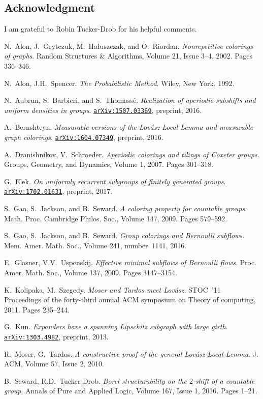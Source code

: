 \documentclass[12pt]{amsart}
\theoremstyle{definition}
\theoremstyle{remark}
\newcommand{\0}{\emptyset}
\numberwithin{equation}{section}
\begin{document}
	\subsection*{Acknowledgment}
	
	I am grateful to Robin Tucker-Drob for his helpful comments.
	
	\begin{thebibliography}{99}\setlength{\itemsep}{-0.001mm}
		 N.~Alon, J.~Grytczuk, M.~Ha\l{}uszczak, and O.~Riordan. \emph{Nonrepetitive colorings of graphs}. Random Structures \& Algorithms, Volume 21, Issue 3--4, 2002. Pages 336--346.
		
		 N.~Alon, J.H.~Spencer. \emph{The Probabilistic Method}. Wiley, New York, 1992.
		
		 N.~Aubrun, S.~Barbieri, and S.~Thomass\'e. \emph{Realization of aperiodic subshifts and uniform densities in groups}. \href{https://arxiv.org/abs/1507.03369}{\texttt{arXiv:1507.03369}}, preprint, 2016.

		
		 A.~Bernshteyn. \emph{Measurable versions of the Lov\'asz Local Lemma and measurable graph colorings}. \href{https://arxiv.org/abs/1604.07349}{\texttt{arXiv:1604.07349}}, preprint, 2016.
		
		 A.~Dranishnikov, V.~Schroeder. \emph{Aperiodic colorings and tilings of Coxeter groups}. Groups, Geometry, and Dynamics, Volume 1, 2007. Pages 301--318.
		
		 G.~Elek. \emph{On uniformly recurrent subgroups of finitely generated groups}. \href{https://arxiv.org/abs/1702.01631}{\texttt{arXiv:1702.01631}}, preprint, 2017. 
		
		 S.~Gao, S.~Jackson, and B.~Seward. \emph{A coloring property for countable groups}. Math. Proc. Cambridge Philos. Soc., Volume 147, 2009. Pages 579--592.
		
		 S.~Gao, S.~Jackson, and B.~Seward. \emph{Group colorings and Bernoulli subflows}. Mem. Amer. Math. Soc., Volume 241, number~1141, 2016.
		
		 E.~Glasner, V.V.~Uspenskij. \emph{Effective minimal subflows of Bernoulli flows}. Proc. Amer. Math. Soc., Volume 137, 2009. Pages 3147--3154.
		
		 K.~Kolipaka, M.~Szegedy. \emph{Moser and Tardos meet Lov\'{a}sz}. STOC~'11 Proceedings of the forty-third annual ACM symposium on Theory of computing, 2011. Pages 235--244.
		
		 G.~Kun. \emph{Expanders have a spanning Lipschitz
			subgraph with large girth}. \href{https://arxiv.org/abs/1303.4982}{\texttt{arXiv:1303.4982}}, preprint, 2013. 
		
		 R.~Moser, G.~Tardos. \emph{A constructive proof of the general Lov\'{a}sz Local Lemma}. J. ACM, Volume 57, Issue 2, 2010.
		
		 B.~Seward, R.D.~Tucker-Drob. \emph{Borel structurability on the $2$-shift of a countable group}. Annals of Pure and Applied Logic, Volume 167, Issue 1, 2016. Pages 1--21.
	\end{thebibliography}
	
\end{document}
